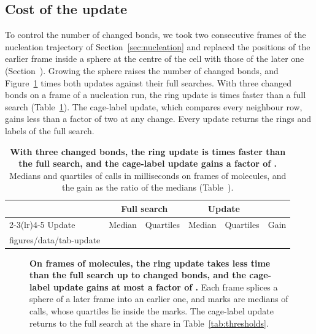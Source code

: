\documentclass[preprint,12pt]{elsarticle}
\makeatletter
\newcommand{\tabbody}[1]{\@@input #1 }
\makeatother
\begin{document}
\subsection{Cost of the update}
\label{sec:churn}

To control the number of changed bonds, we took two consecutive frames of the nucleation trajectory of Section~\ref{sec:nucleation} and replaced the positions of the earlier frame inside a sphere at the centre of the cell with those of the later one (Section~).
Growing the sphere raises the number of changed bonds, and Figure~\ref{fig:churn} times both updates against their full searches.
With three changed bonds on a frame of a nucleation run, the ring update is  times faster than a full search (Table~\ref{tab:update}).
The cage-label update, which compares every neighbour row, gains less than a factor of two at any change.
Every update returns the rings and labels of the full search.

\begin{table}[tbp]
\centering
\caption{\textbf{With three changed bonds, the ring update is  times faster than the full search, and the cage-label update gains a factor of .}
Medians and quartiles of  calls in milliseconds on frames of  molecules, and the gain as the ratio of the medians (Table~).}
\label{tab:update}
\small
\setlength{\tabcolsep}{4pt}
\begin{tabular}{@{}lrrrrr@{}}
\toprule
 & \multicolumn{2}{c}{Full search} & \multicolumn{2}{c}{Update} & \\
\cmidrule(lr){2-3}\cmidrule(lr){4-5}
Update & Median & Quartiles & Median & Quartiles & Gain \\
\midrule
\tabbody{figures/data/tab-update}
\bottomrule
\end{tabular}
\end{table}

\begin{figure}[tbp]
\centering

\caption{\textbf{On frames of  molecules, the ring update takes less time than the full search up to  changed bonds, and the cage-label update gains at most a factor of .}
Each frame splices a sphere of a later frame into an earlier one, and marks are medians of  calls, whose quartiles lie inside the marks.
The cage-label update returns to the full search at the share in Table~\ref{tab:thresholds}.}
\label{fig:churn}
\end{figure}
\end{document}
